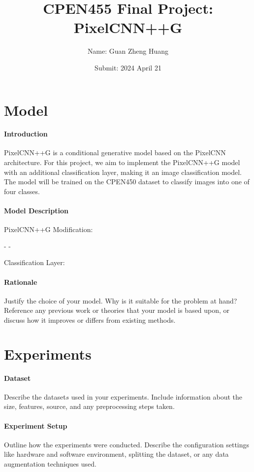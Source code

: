 \documentclass{article}
\title{CPEN455 Final Project: PixelCNN++G}
\author{Name: Guan Zheng Huang}
\date{Submit: 2024 April 21}
\begin{document}
\pagestyle{fancy}
\fancyhead{} %

\maketitle
\thispagestyle{fancy}
\section{Model}

\paragraph{Introduction}
PixelCNN++G is a conditional generative model based on the PixelCNN architecture. For this project, we aim to implement the PixelCNN++G model with an additional classification layer, making it an image classification model. The model will be trained on the CPEN450 dataset to classify images into one of four classes.

\paragraph{Model Description}
PixelCNN++G Modification:

- 
- 

Classification Layer:

\paragraph{Rationale}
Justify the choice of your model. Why is it suitable for the problem at hand? Reference any previous work or theories that your model is based upon, or discuss how it improves or differs from existing methods.

\section{Experiments}

\paragraph{Dataset}
Describe the dataset\(s\) used in your experiments. Include information about the size, features, source, and any preprocessing steps taken.

\paragraph{Experiment Setup}
Outline how the experiments were conducted. Describe the configuration settings like hardware and software environment, splitting the dataset, or any data augmentation techniques used.
\end{document}
